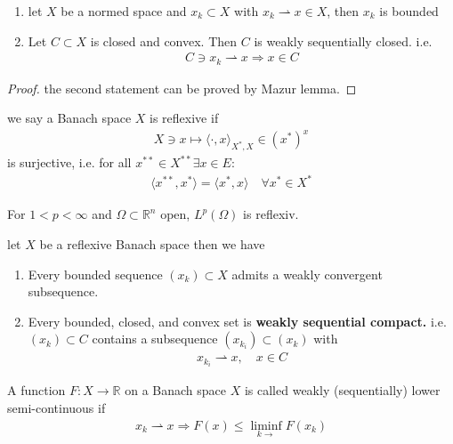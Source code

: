 \begin{lemma}\quad
	\begin{enumerate}
		\item let $X$ be a normed space and $x_k \subset X$ with $x_k \rightharpoonup x \in X$, then $x_k$ is bounded
		\item Let $C \subset X$ is closed and convex. Then $C$ is weakly sequentially closed. i.e.
		\begin{align*}
			C\ni x_k \rightharpoonup x \Rightarrow x \in C
		\end{align*}
	\end{enumerate}
\end{lemma}
\begin{proof}
the second statement can be proved by Mazur lemma. 
\end{proof}

we say a Banach space $X$ is reflexive if 
\begin{align*}
	X \ni x \mapsto \langle \cdot , x\rangle_{X^*, X} \in (x^*)^x
\end{align*}
is surjective, i.e. for all $x^{**} \in X^{**} \exists x \in E:$
\begin{align*}
	\langle x^{**}, x^*\rangle = \langle x^*, x\rangle  \quad \forall x^* \in X^*
\end{align*}

\begin{example}
 For $1 < p < \infty$ and $\Omega \subset \mathbb{R}^n$ open, $L^p(\Omega)$ is reflexiv. 
\end{example}

\begin{theorem}
	let $X$ be a reflexive Banach space then we have
	\begin{enumerate}
		\item Every bounded sequence $(x_k) \subset X$ admits a weakly convergent subsequence. 
		\item Every bounded, closed, and convex set is \textbf{weakly sequential compact.} i.e. $(x_k) \subset C$ contains a subsequence $(x_{k_i}) \subset (x_k)$ with
		\begin{align*}
			x_{k_i} \rightharpoonup x, \quad x \in C
		\end{align*} 
	\end{enumerate}
\end{theorem}

A function $F: X \rightarrow \mathbb{R}$ on a Banach space $X$ is called weakly (sequentially) lower semi-continuous if 
\begin{align*}
	x_k \rightharpoonup x \Rightarrow F(x) \le \liminf_{k \rightarrow} F(x_k)
\end{align*}

